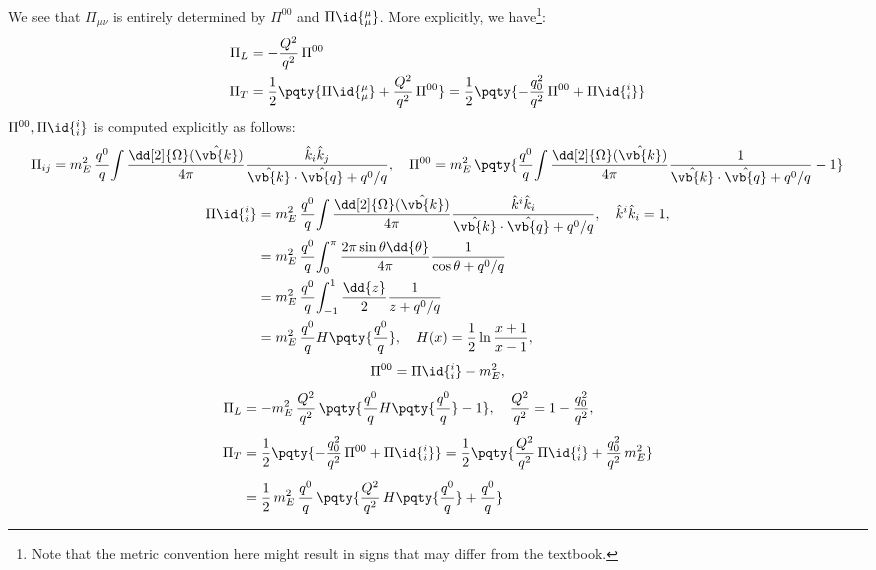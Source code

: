 \documentclass[a4paper,10pt]{article}
\begin{document}
	We see that $\Pi_{\mu\nu}$ is entirely determined by $\Pi^{00}$ and $\Pi\id{^\mu_\mu}$. More explicitly, we have\footnote{
		Note that the metric convention here might result in signs that may differ from the textbook. 
	}:
	\begin{equation}
	\begin{aligned}
		\Pi_L
		&= -\frac{Q^2}{q^2}\, \Pi^{00} \\
		\Pi_T
		&= \frac{1}{2} \pqty{
				\Pi\id{^\mu_\mu}
				+ \frac{Q^2}{q^2}\, \Pi^{00}
			}
		= \frac{1}{2} \pqty{
				- \frac{q_0^2}{q^2}\, \Pi^{00}
				+ \Pi\id{^i_i}
			}
	\end{aligned}
	\end{equation}
	$\Pi^{00}, \Pi\id{^i_i}$ is computed explicitly as follows:
	\begin{equation}
		\Pi_{ij}
		= m^2_E \,\frac{q^0}{q}\!
			\int \frac{\dd[2]{\Omega}(\hat{\vb{k}})}{4\pi}
				\frac{\hat{k}_i \hat{k}_j}{
					\hat{\vb{k}} \cdot\hat{\vb{q}}
					+ q^0/q
				},\quad
		\Pi^{00}
		= m^2_E\, \pqty{
			\frac{q^0}{q}\!
			\int \frac{\dd[2]{\Omega}(\hat{\vb{k}})}{4\pi}
				\frac{1}{
					\hat{\vb{k}} \cdot\hat{\vb{q}}
					+ q^0/q
				}
			- 1
		}
	\end{equation}
	\begin{equation}
	\begin{aligned}
		\Pi\id{^i_i}
		&= m^2_E \,\frac{q^0}{q}\!
			\int \frac{\dd[2]{\Omega}(\hat{\vb{k}})}{4\pi}
				\frac{\hat{k}^i \hat{k}_i}{
					\hat{\vb{k}} \cdot\hat{\vb{q}}
					+ q^0/q
				},\quad
			\hat{k}^i \hat{k}_i = 1, \\
		&= m^2_E \,\frac{q^0}{q}\!
			\int_0^\pi \frac{
				2\pi\sin\theta \dd{\theta}
			}{4\pi}
				\frac{1}{
					\cos\theta + q^0/q
				} \\
		&= m^2_E \,\frac{q^0}{q}\!
			\int_{-1}^1
				\frac{\dd{z}}{2}
				\frac{1}{
					z + q^0/q
				} \\
		&= m^2_E \,\frac{q^0}{q}
			H\pqty{\frac{q^0}{q}},\quad
			H(x) = \frac{1}{2}
				\ln \frac{x + 1}{x - 1}, \\
	\end{aligned}
	\end{equation}
	\begin{equation}
		\Pi^{00} = \Pi\id{^i_i} - m^2_E, 
	\end{equation}
	\begin{equation}
	\begin{aligned}
		\Pi_L
		&= - m^2_E \,\frac{Q^2}{q^2}\, \pqty{
			\frac{q^0}{q} H\pqty{\frac{q^0}{q}}
			- 1 
		},\quad
			\frac{Q^2}{q^2}
			= 1 - \frac{q_0^2}{q^2},
	\\[1ex]
		\Pi_T
		&= \frac{1}{2} \pqty{
				- \frac{q_0^2}{q^2}\, \Pi^{00}
				+ \Pi\id{^i_i}
			}
		= \frac{1}{2} \pqty{
				\frac{Q^2}{q^2}\, \Pi\id{^i_i}
				+ \frac{q_0^2}{q^2}\, m^2_E
			}
		\\[1ex]
		&= \frac{1}{2}\, m^2_E \,\frac{q^0}{q}\, \pqty{
				\frac{Q^2}{q^2}\, H\pqty{\frac{q^0}{q}}
				+ \frac{q^0}{q}
			}
	\end{aligned}
	\end{equation}
\end{document}
